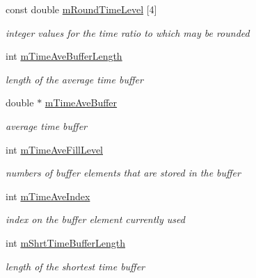 \begin{DoxyCompactItemize}
const double \hyperlink{classMorseDecode_a55c259a7cffa248023b531e0b9be5fe9}{m\+Round\+Time\+Level} \mbox{[}4\mbox{]}
\begin{DoxyCompactList}\small\item\em integer values for the time ratio to which may be rounded \end{DoxyCompactList}\item 
\mbox{\label{classMorseDecode_a662aca7910aa435762829c6fd5adcff6}} 
int \hyperlink{classMorseDecode_a662aca7910aa435762829c6fd5adcff6}{m\+Time\+Ave\+Buffer\+Length}
\begin{DoxyCompactList}\small\item\em length of the average time buffer \end{DoxyCompactList}\item 
\mbox{\label{classMorseDecode_a54619263c6da9333af612073f6feb095}} 
double $\ast$ \hyperlink{classMorseDecode_a54619263c6da9333af612073f6feb095}{m\+Time\+Ave\+Buffer}
\begin{DoxyCompactList}\small\item\em average time buffer \end{DoxyCompactList}\item 
\mbox{\label{classMorseDecode_a51e8d34837092c6abb557e342d097029}} 
int \hyperlink{classMorseDecode_a51e8d34837092c6abb557e342d097029}{m\+Time\+Ave\+Fill\+Level}
\begin{DoxyCompactList}\small\item\em numbers of buffer elements that are stored in the buffer \end{DoxyCompactList}\item 
\mbox{\label{classMorseDecode_a4f7ceb21a9be76e1731eb018cb371e2a}} 
int \hyperlink{classMorseDecode_a4f7ceb21a9be76e1731eb018cb371e2a}{m\+Time\+Ave\+Index}
\begin{DoxyCompactList}\small\item\em index on the buffer element currently used \end{DoxyCompactList}\item 
\mbox{\label{classMorseDecode_a2a23bcb0a8a38b53373c667187aeb0ba}} 
int \hyperlink{classMorseDecode_a2a23bcb0a8a38b53373c667187aeb0ba}{m\+Shrt\+Time\+Buffer\+Length}
\begin{DoxyCompactList}\small\item\em length of the shortest time buffer \end{DoxyCompactList}\item 

\end{DoxyCompactItemize}

